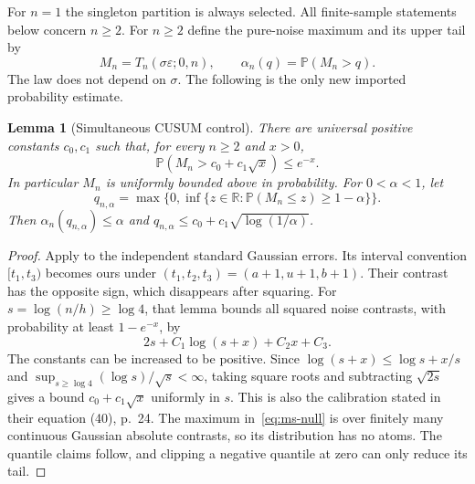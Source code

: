\documentclass[pdflatex,sn-mathphys-num]{sn-jnl}
\newcommand{\Prob}{\mathbb P}
\newcommand{\R}{\mathbb R}
\theoremstyle{thmstyleone}
\newtheorem{lemma}[theorem]{Lemma}
\theoremstyle{thmstyletwo}
\begin{document}
For $n=1$ the singleton partition is always selected. All finite-sample
statements below concern $n\ge2$.
For $n\ge2$ define the pure-noise maximum and its upper tail by
\begin{equation}\label{eq:ms-null}
M_n=T_n(\sigma\varepsilon;0,n),\qquad
\alpha_n(q)=\Prob(M_n>q).
\end{equation}
The law does not depend on $\sigma$. The following is the only new imported
probability estimate.

\begin{lemma}[Simultaneous CUSUM control]\label{lem:ms-noise}
There are universal positive constants $c_0,c_1$ such that, for every
$n\ge2$ and $x>0$,
\begin{equation}\label{eq:ms-tail}
\Prob(M_n>c_0+c_1\sqrt{x})\le e^{-x}.
\end{equation}
In particular $M_n$ is uniformly bounded above in probability. For
$0<\alpha<1$, let
\begin{equation}\label{eq:ms-quantile}
q_{n,\alpha}=
\max\bigl\{0,\inf\{z\in\R:\Prob(M_n\le z)\ge1-\alpha\}\bigr\}.
\end{equation}
Then $\alpha_n(q_{n,\alpha})\le\alpha$ and
$q_{n,\alpha}\le c_0+c_1\sqrt{\log(1/\alpha)}$.
\end{lemma}
\begin{proof}
Apply \cite[Lemma 9, equation (79), p.~45 of the arXiv version]{verzelen2020}
to the independent standard Gaussian errors. Its interval convention
$[t_1,t_3)$ becomes ours under $(t_1,t_2,t_3)=(a+1,u+1,b+1)$.
Their contrast has the opposite sign, which disappears after squaring.
For $s=\log(n/h)\ge\log4$, that lemma bounds all squared noise contrasts,
with probability at least $1-e^{-x}$, by
\[
2s+C_1\log(s+x)+C_2x+C_3.
\]
The constants can be increased to be positive. Since
$\log(s+x)\le\log s+x/s$ and
$\sup_{s\ge\log4}(\log s)/\sqrt{s}<\infty$, taking square roots and
subtracting $\sqrt{2s}$ gives a bound $c_0+c_1\sqrt{x}$ uniformly in $s$.
This is also the calibration stated in their equation (40), p.~24.
The maximum in~\eqref{eq:ms-null} is over finitely many continuous Gaussian
absolute contrasts, so its distribution has no atoms. The quantile claims
follow, and clipping a negative quantile at zero can only reduce its tail.
\end{proof}
\end{document}
